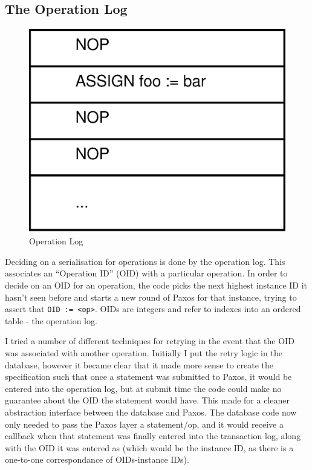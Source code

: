 \documentclass[12pt,twoside,notitlepage]{report}
\begin{document}
\subsection{The Operation Log}

\begin{figure}[htb]
\centering
\includegraphics[scale=0.5]{figs/op-log.eps}
\caption{\label{fig:op-log}Operation Log}
\end{figure}

Deciding on a serialisation for operations is done by the operation log. This associates an
``Operation ID'' (OID) with a particular operation. In order to decide on an OID for an operation,
the code picks the next highest instance ID it hasn't seen before and starts a new round of Paxos
for that instance, trying to assert that \verb$OID := <op>$. OIDs are integers and refer to
indexes into an ordered table - the operation log.

I tried a number of different techniques for retrying in the event that the OID was associated
with another operation. Initially I put the retry logic in the database, however it became clear
that it made more sense to create the specification such that once a statement was submitted to
Paxos, it would be entered into the operation log, but at submit time the code could make no
guarantee about the OID the statement would have. This made for a cleaner abstraction interface
between the database and Paxos. The database code now only needed to pass the Paxos layer a
statement/op, and it would receive a callback when that statement was finally entered into the
transaction log, along with the OID it was entered as (which would be the instance ID, as there is
a one-to-one correspondance of OIDs-instance IDs).
\end{document}
